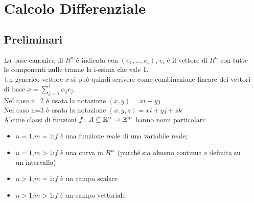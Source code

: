 \chapter{Calcolo Differenziale}

\section{Preliminari}
La base canonica di $R^n$ è indicata con $(e_1,...,e_i)$, $e_i$ è il vettore di $R^n$ con tutte le componenti nulle tranne la i-esima che vale 1.\\
Un generico vettore $x$ si può quindi scrivere come combinazione lineare dei vettori di base $x=\sum\limits_{j=1}^{i}\alpha_j e_j$.\\
Nel caso n=2 è usata la notazione $(x,y)=xi+yj$\\
Nel caso n=3 è usata la notazione $(x,y,z)=xi+yj+zk$\\
Alcune classi di funzioni $f:A\subseteq\mathbb{R}^n\rightarrow\mathbb{R}^m$ hanno nomi particolari:
\begin{itemize}
	\item 
	$n=1$,$m=1$:$f$ è una funzione reale di una variabile reale;
	\item 
	$n=1$,$m>1$:$f$ è una curva in $R^m$ (purché sia almeno continua e definita su un intervallo)
	\item 
	$n>1$,$m=1$:$f$ è un campo scalare
	\item
	$n>1$,$m>1$:$f$ è un campo vettoriale
\end{itemize}
